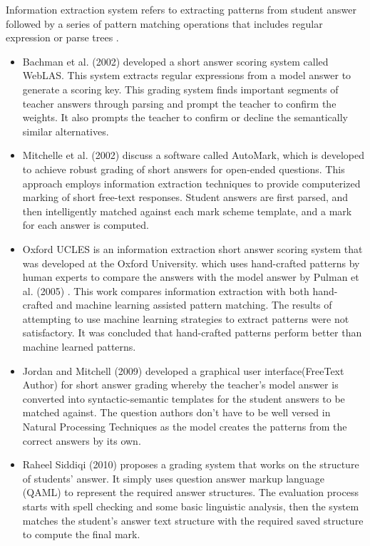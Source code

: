 Information extraction system refers to 
extracting patterns from student answer followed by a series of pattern matching operations that includes regular expression or parse trees \cite{Burrows2015}.

\begin{itemize} 
	
	\item Bachman et al. (2002) \cite{Bachman2002} developed a short answer scoring system called WebLAS.  This system extracts regular expressions from a model answer to generate a scoring key. This grading system finds important segments of teacher answers through parsing and prompt the teacher to confirm the weights. It also prompts the teacher to confirm or decline the semantically similar alternatives.
	\item Mitchelle et al. (2002) \cite{Mitchell2002} discuss a software called AutoMark, which is developed to achieve robust grading of short answers for open-ended questions. This approach employs information extraction techniques to provide computerized marking of short free-text responses. Student answers are first parsed, and then intelligently matched against each mark scheme template, and a mark for each answer is computed. 
	\item Oxford UCLES is an information extraction short answer scoring system that was developed at the Oxford University.  which uses hand-crafted patterns by human experts to compare the answers with the model answer by Pulman et al. (2005) \cite{Pulman2005}. This work compares information extraction with both hand-crafted and machine learning assisted pattern matching.  The results of attempting to use machine learning strategies to extract patterns were not satisfactory.  It was concluded that hand-crafted patterns perform better than machine learned patterns. 
	\item Jordan and Mitchell (2009) \cite{Jordan2009} developed a graphical user interface(FreeText Author) for short answer grading whereby the teacher’s model answer is converted into syntactic-semantic templates for the student answers to be matched against. The question authors don’t have to be well versed in Natural Processing Techniques as the model creates the patterns from the correct answers by its own.
	\item Raheel Siddiqi (2010)\cite{Siddiqi2010} proposes a grading system that works on the structure of students' answer. It simply uses question answer markup language (QAML) to represent the required answer structures. The evaluation process starts with spell checking and some basic linguistic analysis, then the system matches the student’s answer text structure with the required saved structure to compute the final mark.

\end{itemize}
